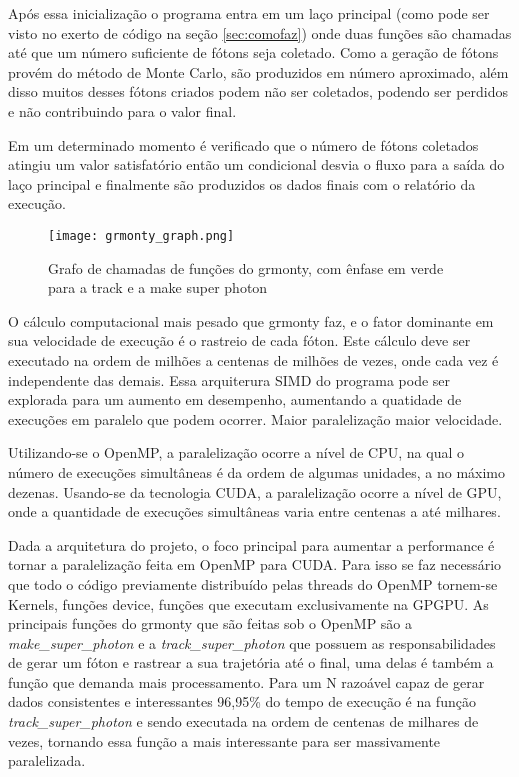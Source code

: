   Após essa inicialização o programa entra em um laço principal (como pode ser visto no exerto de código na seção \ref{sec:comofaz}) onde duas funções são chamadas até que um número suficiente de fótons seja coletado. Como a geração de fótons provém do método de Monte Carlo, são produzidos em número aproximado, além disso muitos desses fótons criados podem não ser coletados, podendo ser perdidos e não contribuindo para o valor final.

  Em um determinado momento é verificado que o número de fótons coletados atingiu um valor satisfatório então um condicional desvia o fluxo para a saída do laço principal e finalmente são produzidos os dados finais com o relatório da execução.

  \begin{figure}[!h]
    \centering
    \texttt{[image: grmonty\_graph.png]}
    \caption{Grafo de chamadas de funções do grmonty, com ênfase em verde para a track e a make super photon}
    \label{fig:grmontyGraph}
  \end{figure}

  O cálculo computacional mais pesado que grmonty faz, e o fator dominante em sua velocidade de execução é o rastreio de cada fóton. Este cálculo deve ser executado na ordem de milhões a centenas de milhões de vezes, onde cada vez é independente das demais. Essa arquiterura SIMD do programa pode ser explorada para um aumento em desempenho, aumentando a quatidade de execuções em paralelo que podem ocorrer. Maior paralelização maior velocidade.
  
  Utilizando-se o OpenMP, a paralelização ocorre a nível de CPU, na qual o número de execuções simultâneas é da ordem de algumas unidades, a no máximo dezenas. Usando-se da tecnologia CUDA, a paralelização ocorre a nível de GPU, onde a quantidade de execuções simultâneas varia entre centenas a até milhares.

  Dada a arquitetura do projeto, o foco principal para aumentar a performance é tornar a paralelização feita em OpenMP para CUDA. Para isso se faz necessário que todo o código previamente distribuído pelas threads do OpenMP tornem-se Kernels, funções device, funções que executam exclusivamente na GPGPU. As principais funções do grmonty que são feitas sob o OpenMP são a \textit{make\_super\_photon} e a \textit{track\_super\_photon} que possuem as responsabilidades de gerar um fóton e rastrear a sua trajetória até o final, uma delas é também a função que demanda mais processamento. Para um N razoável capaz de gerar dados consistentes e interessantes 96,95\% do tempo de execução é na função \textit{track\_super\_photon} e sendo executada na ordem de centenas de milhares de vezes, tornando essa função a mais interessante para ser massivamente paralelizada.

